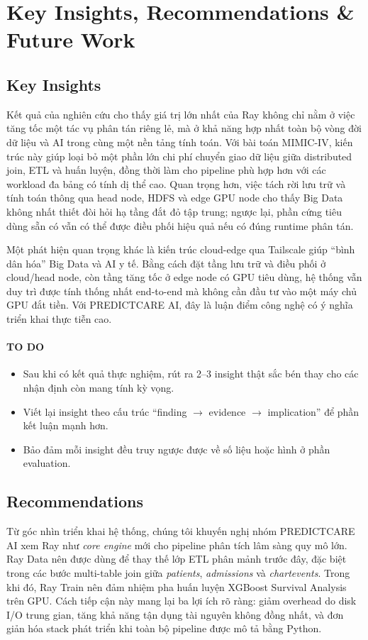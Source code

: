 \section{Key Insights, Recommendations \& Future Work}

\subsection{Key Insights}
Kết quả của nghiên cứu cho thấy giá trị lớn nhất của Ray không chỉ nằm ở việc tăng tốc một tác vụ phân tán riêng lẻ, mà ở khả năng hợp nhất toàn bộ vòng đời dữ liệu và AI trong cùng một nền tảng tính toán. Với bài toán MIMIC-IV, kiến trúc này giúp loại bỏ một phần lớn chi phí chuyển giao dữ liệu giữa distributed join, ETL và huấn luyện, đồng thời làm cho pipeline phù hợp hơn với các workload đa bảng có tính dị thể cao. Quan trọng hơn, việc tách rời lưu trữ và tính toán thông qua head node, HDFS và edge GPU node cho thấy Big Data không nhất thiết đòi hỏi hạ tầng đắt đỏ tập trung; ngược lại, phần cứng tiêu dùng sẵn có vẫn có thể được điều phối hiệu quả nếu có đúng runtime phân tán.

Một phát hiện quan trọng khác là kiến trúc cloud-edge qua Tailscale giúp ``bình dân hóa'' Big Data và AI y tế. Bằng cách đặt tầng lưu trữ và điều phối ở cloud/head node, còn tầng tăng tốc ở edge node có GPU tiêu dùng, hệ thống vẫn duy trì được tính thống nhất end-to-end mà không cần đầu tư vào một máy chủ GPU đắt tiền. Với PREDICTCARE AI, đây là luận điểm công nghệ có ý nghĩa triển khai thực tiễn cao.

\paragraph{TO DO}
\begin{itemize}
    \item Sau khi có kết quả thực nghiệm, rút ra 2--3 insight thật sắc bén thay cho các nhận định còn mang tính kỳ vọng.
    \item Viết lại insight theo cấu trúc ``finding $\rightarrow$ evidence $\rightarrow$ implication'' để phần kết luận mạnh hơn.
    \item Bảo đảm mỗi insight đều truy ngược được về số liệu hoặc hình ở phần evaluation.
\end{itemize}

\subsection{Recommendations}
Từ góc nhìn triển khai hệ thống, chúng tôi khuyến nghị nhóm PREDICTCARE AI xem Ray như \textit{core engine} mới cho pipeline phân tích lâm sàng quy mô lớn. Ray Data nên được dùng để thay thế lớp ETL phân mảnh trước đây, đặc biệt trong các bước multi-table join giữa \textit{patients}, \textit{admissions} và \textit{chartevents}. Trong khi đó, Ray Train nên đảm nhiệm pha huấn luyện XGBoost Survival Analysis trên GPU. Cách tiếp cận này mang lại ba lợi ích rõ ràng: giảm overhead do disk I/O trung gian, tăng khả năng tận dụng tài nguyên không đồng nhất, và đơn giản hóa stack phát triển khi toàn bộ pipeline được mô tả bằng Python.

